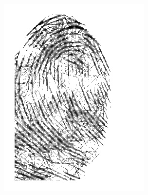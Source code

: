 \documentclass{beamer}
\begin{document}
{\begin{figure}[!ht]
\begin{subfigure}[ht]{0.15\textwidth}
            \includegraphics[width=\textwidth]{fingerprints/2004Db4a/1_2_filtered.jpg}
        \end{subfigure}
    \end{figure}
    \begin{figure}[!ht]
        \centering
        \begin{subfigure}[ht]{0.15\textwidth}

\end{subfigure}
\end{figure}}
\end{document}
